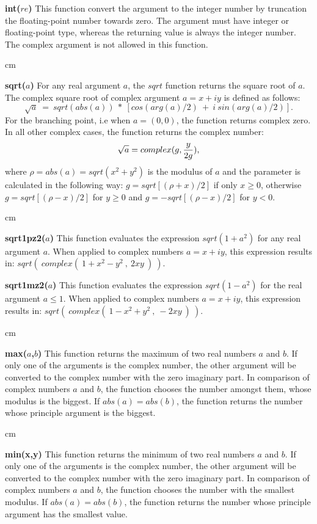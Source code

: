 {\bf int($re$)}\hfil\break
This function convert the argument to the integer number
by truncation the floating-point number towards zero.
The argument must have integer or floating-point type,
whereas the returning value is always the integer number.
The complex argument is not allowed in this function. 

 cm

{\bf sqrt($a$)}\hfil\break
For any real argument $a$, 
the $sqrt$ function returns the square root of $a$.
The complex square root of complex argument $a=x+iy$
is defined as follows: 
$$\sqrt{a}\ =\ sqrt(abs(a))\ *\ [ cos(arg(a)/2) \ +\ i\ sin(arg(a)/2) ] .$$
For the branching point, i.e when $a=(0,0)$, the function
returns complex zero.
In all other complex cases, the function returns the complex number:
$$\sqrt{a} = complex(g, { {y} \over {2g} }) ,$$
where  $\rho = abs(a) = sqrt(x^2 + y^2)$ is the modulus of $a$ and
the parameter is calculated in the following way: 
$g=sqrt[(\rho + x)/2]$ if only $x \ge 0$, otherwise
$g=sqrt[(\rho-x)/2]$ for $y \ge 0$
and $g=-sqrt[(\rho-x)/2]$ for $y<0$.

 cm

{\bf sqrt1pz2($a$)}\hfil\break
This function evaluates the expression $sqrt(1+a^2)$ for any real
argument $a$.
When applied to complex numbers $a=x+iy$, this expression
results in:
$sqrt(\ complex(\ 1+x^2-y^2\ ,\ 2xy\ )\ )$.

\newpage

{\bf sqrt1mz2($a$)}\hfil\break
This function evaluates the expression $sqrt(1-a^2)$ for the real
argument $a \le 1$.
When applied to complex numbers $a=x+iy$, this expression
results in:
$sqrt(\ complex(\ 1-x^2+y^2\ ,\ -2xy\ )\ )$.

 cm

{\bf max($a$,$b$)}\hfil\break
This function returns the maximum of two real numbers $a$ and $b$.
If only one of the arguments is the complex number, the other
argument will be converted to the complex number with
the zero imaginary part.
In comparison of complex numbers $a$ and $b$,
the function chooses the number amongst them, whose
modulus is the biggest. If $abs(a)=abs(b)$,
the function returns the number whose principle argument
is the biggest.

 cm

{\bf min(x,y)}\hfil\break
This function returns the minimum of two real numbers $a$ and $b$.
If only one of the arguments is the complex number, the other
argument will be converted to the complex number with
the zero imaginary part.
In comparison of complex numbers $a$ and $b$,
the function chooses the number with the smallest modulus.
If $abs(a)=abs(b)$,
the function returns the number whose principle argument
has the smallest value.

